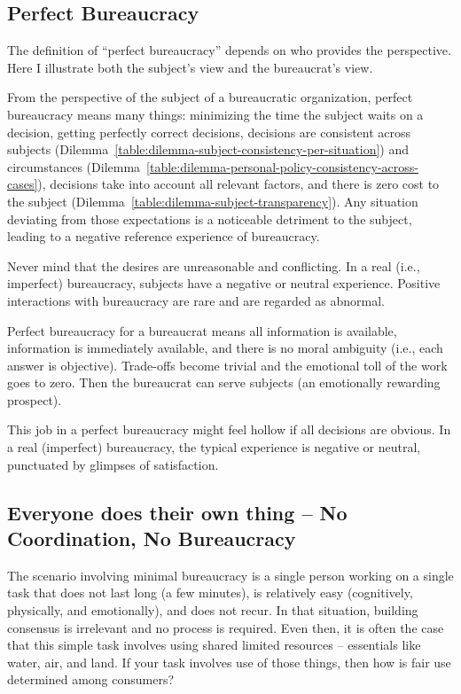 \subsection*{Perfect Bureaucracy}

The definition of ``perfect bureaucracy'' depends on who provides the perspective. Here I illustrate both the subject's view and the bureaucrat's view. 

From the perspective of the subject of a bureaucratic organization, perfect bureaucracy means many things: minimizing the time the subject waits on a decision, getting perfectly correct decisions, decisions are consistent across subjects (Dilemma~\ref{table:dilemma-subject-consistency-per-situation})
and circumstances (Dilemma~\ref{table:dilemma-personal-policy-consistency-across-cases}), decisions take into account all relevant factors, and there is zero cost to the subject (Dilemma~\ref{table:dilemma-subject-transparency}). 
Any situation deviating from those expectations is a noticeable detriment to the subject, leading to a negative reference experience of bureaucracy. 

Never mind that the desires are unreasonable and conflicting. In a real (i.e., imperfect) bureaucracy, subjects have a negative or neutral experience. Positive interactions with bureaucracy are rare and are regarded as abnormal.

Perfect bureaucracy for a bureaucrat means all information is available, information is immediately available, and there is no moral ambiguity (i.e., each answer is objective). Trade-offs become trivial and the emotional toll of the work goes to zero. Then the bureaucrat can serve subjects (an emotionally rewarding prospect). 

This job in a perfect bureaucracy might feel hollow if all decisions are obvious. In a real (imperfect) bureaucracy, the typical experience is negative or neutral, punctuated by glimpses of satisfaction. 

\subsection*{Everyone does their own thing -- No Coordination, No Bureaucracy}
The scenario involving minimal bureaucracy is a single person working on a single task that does not last long (a few minutes), is relatively easy (cognitively, physically, and emotionally), and does not recur. In that situation, building consensus is irrelevant and no process is required. Even then, it is often the case that this simple task involves using shared limited resources --  essentials like water, air, and land. If your task involves use of those things, then how is fair use determined among consumers?

